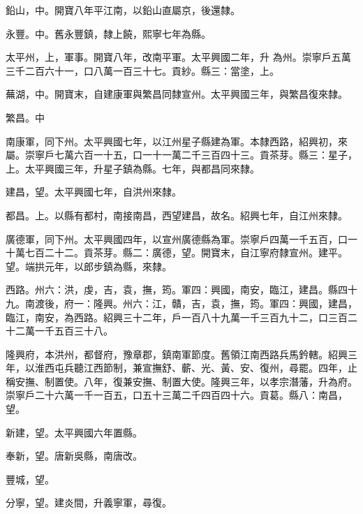 \begin{pinyinscope}
 鉛山，中。開寶八年平江南，以鉛山直屬京，後還隸。



 永豐。中。舊永豐鎮，隸上饒，熙寧七年為縣。



 太平州，上，軍事。開寶八年，改南平軍。太平興國二年，升
 為州。崇寧戶五萬三千二百六十一，口八萬一百三十七。貢紗。縣三：當塗，上。



 蕪湖，中。開寶末，自建康軍與繁昌同隸宣州。太平興國三年，與繁昌復來隸。



 繁昌。中



 南康軍，同下州。太平興國七年，以江州星子縣建為軍。本隸西路，紹興初，來屬。崇寧戶七萬六百一十五，口一十一萬二千三百四十三。貢茶芽。縣三：星子，上。太平興國三年，升星子鎮為縣。七年，與都昌同來隸。



 建昌，望。太平興國七年，自洪州來隸。



 都昌。上。以縣有都村，南接南昌，西望建昌，故名。紹興七年，自江州來隸。



 廣德軍，同下州。太平興國四年，以宣州廣德縣為軍。崇寧戶四萬一千五百，口一十萬七百二十二。貢茶芽。縣二：廣德，望。開寶末，自江寧府隸宣州。建平。望。端拱元年，以郎步鎮為縣，來隸。



 西路。州六：洪，虔，吉，袁，撫，筠。軍四：興國，南安，臨江，建昌。縣四十九。南渡後，府一：隆興。州六：江，贛，吉，袁，撫，筠。軍四：興國，建昌，臨江，南安，為西路。紹興三十二年，戶一百八十九萬一千三百九十二，口三百二十二萬一千五百三十八。



 隆興府，本洪州，都督府，豫章郡，鎮南軍節度。舊領江南西路兵馬鈐轄。紹興三年，以淮西屯兵聽江西節制，兼宣撫舒、蘄、光、黃、安、復州，尋罷。四年，止稱安撫、制置使。八年，復兼安撫、制置大使。隆興三年，以孝宗潛藩，升為府。崇寧戶二十六萬一千一百五，口五十三萬二千四百四十六。貢葛。縣八：南昌，望。



 新建，望。太平興國六年置縣。



 奉新，望。唐新吳縣，南唐改。



 豐城，望。



 分寧，望。建炎間，升義寧軍，尋復。




\end{pinyinscope}
